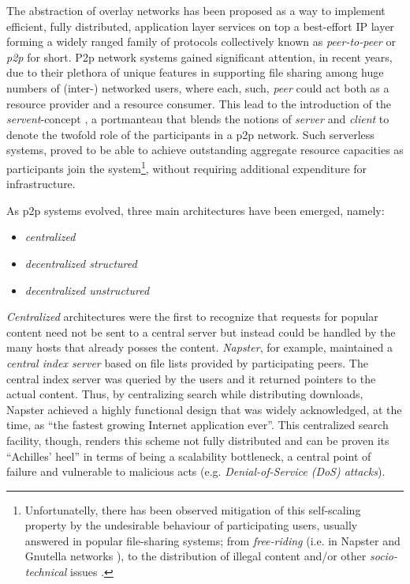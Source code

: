 \documentclass[a4paper,10pt]{article}
\begin{document}
The abstraction of overlay networks has been proposed as a way to implement efficient, fully distributed, application layer services on top a best-effort IP layer forming a widely ranged family of protocols collectively known as \emph{peer-to-peer} or \emph{p2p} for short. P2p network systems gained significant attention, in recent years, due to their plethora of unique features in supporting file sharing among huge numbers of (inter-) networked users, where each, such, \emph{peer} could act both as a resource provider and a resource consumer. This lead to the introduction of the \emph{servent}-concept \cite{gnutella}, a portmanteau that blends the notions of \emph{server} and \emph{client} to denote the twofold role of the participants in a p2p network. Such serverless systems, proved to be able to achieve outstanding aggregate resource capacities as participants join the system\footnote{Unfortunatelly, there has been observed mitigation of this self-scaling property by the undesirable behaviour of participating users, usually answered in popular file-sharing systems; from \emph{free-riding} (i.e. in Napster and Gnutella networks \cite{saroiu_measurefileshare_2002, adar_gnutellafreeriders_2000, hughes_gnutellafreeride_2005}), to the distribution of illegal content and/or other \emph{socio-technical} issues \cite{hughes_socp2p_2008}.}, without requiring additional expenditure for infrastructure.

As p2p systems evolved, three main architectures have been emerged, namely:
\begin{itemize}
  \item \emph{centralized}
  \item \emph{decentralized structured}
  \item \emph{decentralized unstructured}
\end{itemize}

\emph{Centralized} architectures were the first to recognize that requests for popular content need not be sent to a central server but instead could be handled by the many hosts that already posses the content. \emph{Napster}, for example, maintained a \emph{central index server} based on file lists provided by participating peers. The central index server was queried by the users and it returned pointers to the actual content. Thus, by centralizing search while distributing downloads, Napster achieved a highly functional design that was widely acknowledged, at the time, as ``the fastest growing Internet application ever''. This centralized search facility, though, renders this scheme not fully distributed and can be proven its ``Achilles' heel'' in terms of being a scalability bottleneck, a central point of failure and vulnerable to malicious acts (e.g. \emph{Denial-of-Service (DoS) attacks}).
\end{document}
